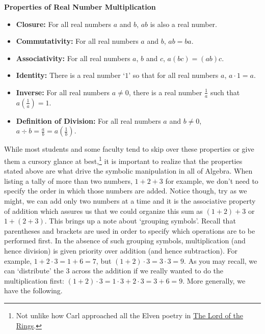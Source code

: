\documentclass{ximera}
\begin{document}
\medskip

\label{realnumbermultiplication}


\centerline{\textbf{Properties of Real Number Multiplication}}

\begin{itemize}

\item  \textbf{Closure:}  For all real numbers $a$ and $b$,  $ab$ is also a real number.

\item  \textbf{Commutativity:}  For all real numbers $a$ and $b$, $ab = ba$.

\item  \textbf{Associativity:}  For all real numbers $a$, $b$ and $c$, $a(bc) = (ab)c$.

\item  \textbf{Identity:}  There is a real number `$1$' so that for all real numbers $a$, $a \cdot 1 = a$.

\item  \textbf{Inverse:}  For all real numbers $a \neq 0$, there is a real number $\frac{1}{a}$ such that $a \left(\frac{1}{a}\right) = 1$.

\item \textbf{Definition of Division:}  For all real numbers $a$ and $b \neq 0$, $a \div b = \frac{a}{b} = a  \left(\frac{1}{b}\right)$.

\end{itemize}


\medskip

While most students and some faculty tend to skip over these properties or give them a cursory glance at best,\footnote{Not unlike how Carl approached all the Elven poetry in \underline{The Lord of the Rings}.} it is important to realize that the properties stated above are what drive the symbolic manipulation in all of Algebra.  When listing a tally of more than two numbers, $1 + 2 + 3$\label{howtoaddonetwothree} for example, we don't need to specify the order in which those numbers are added. Notice though, try as we might, we can add only two numbers at a time and it is the associative property of addition which assures us that we could organize this sum as $(1+2) + 3$ or $1+(2+3)$.  This brings up a note about `grouping symbols'.  Recall that parentheses and brackets are used in order to specify which operations are to be performed first.  In the absence of such grouping symbols, multiplication (and hence division) is given priority over addition (and hence subtraction). For example, $1 + 2 \cdot 3 = 1+6 = 7$, but $(1+2) \cdot 3 = 3 \cdot 3 = 9$.  As you may recall, we can `distribute' the $3$ across the addition if we really wanted to do the multiplication first:  $(1+2) \cdot 3 = 1\cdot 3 + 2 \cdot 3 = 3 + 6 = 9$. More generally, we have the following.
\end{document}
